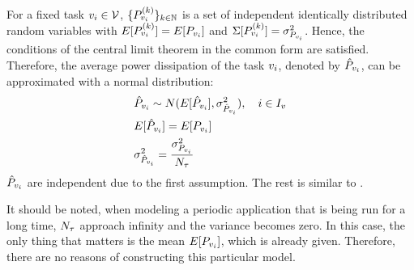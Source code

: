 For a fixed task $v_i \in \mathcal{V}$, $\{ P^{(k)}_{v_i} \}_{k \in \mathbb{N}}$ is a set of independent identically distributed random variables with $E[P^{(k)}_{v_i}] = E[P_{v_i}]$ and $\Sigma[P^{(k)}_{v_i}] = \sigma_{P_{v_i}}^2$. Hence, the conditions of the central limit theorem in the common form are satisfied. Therefore, the average power dissipation of the task $v_i$, denoted by $\hat{P}_{v_i}$, can be approximated with a normal distribution:
\begin{align*}
  & \hat{P}_{v_i} \sim N(E[\hat{P}_{v_i}], \sigma_{\hat{P}_{v_i}}^2), \hspace{10pt} i \in I_v \\
  & E[\hat{P}_{v_i}] = E[P_{v_i}] \\
  & \sigma_{\hat{P}_{v_i}}^2 = \frac{\sigma_{P_{v_i}}^2}{N_{\tau}}
\end{align*}
$\hat{P}_{v_i}$ are independent due to the first assumption. The rest is similar to .

It should be noted, when modeling a periodic application that is being run for a long time, $N_{\tau}$ approach infinity and the variance becomes zero. In this case, the only thing that matters is the mean $E[P_{v_i}]$, which is already given. Therefore, there are no reasons of constructing this particular model.
